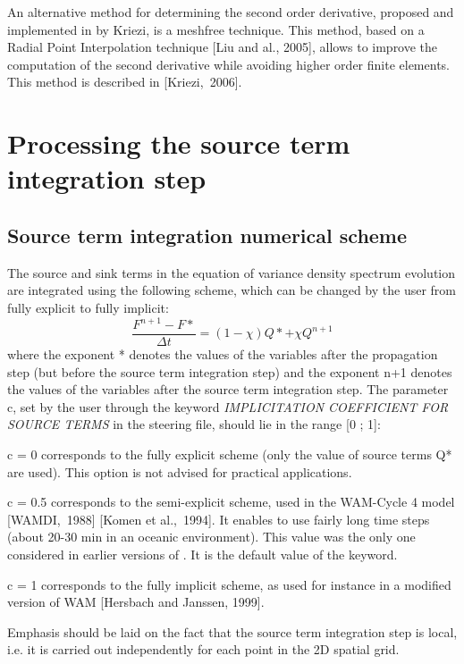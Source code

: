  An alternative method for determining the second order derivative, proposed and implemented in \tomawac by Kriezi, is a meshfree technique. This method, based on a Radial Point Interpolation technique [Liu and al., 2005], allows to improve the computation of the second derivative while avoiding higher order finite elements. This method is described in [Kriezi,~2006].




\section{ Processing the source term integration step}


\subsection{ Source term integration numerical scheme }

 The source and sink terms in the equation of variance density spectrum evolution are integrated using the following scheme, which can be changed by the user from fully explicit to fully implicit:
\begin{equation} \label{GrindEQ__6_10_}
\frac{F^{n+1} -F*}{\Delta t} =\left(1-\chi \right)Q*+\chi Q^{n+1}
\end{equation}
where the exponent * denotes the values of the variables after the propagation step (but before the source term integration step) and the exponent n+1 denotes the values of the variables after the source term integration step. The parameter c, set by the user through the keyword \textit{IMPLICITATION COEFFICIENT FOR SOURCE TERMS} in the steering file, should lie in the range [0 ; 1]:

 c = 0 corresponds to the fully explicit scheme (only the value of source terms Q* are used). This option is not advised for practical applications.

 c = 0.5 corresponds to the semi-explicit scheme, used in the WAM-Cycle 4 model [WAMDI,~1988] [Komen et al.,~1994]. It enables to use fairly long time steps (about 20-30 min in an oceanic environment). This value was the only one considered in earlier versions of \tomawac. It is the default value of the keyword.

 c = 1 corresponds to the fully implicit scheme, as used for instance in a modified version of WAM [Hersbach and Janssen, 1999].

 Emphasis should be laid on the fact that the source term integration step is local, i.e. it is carried out independently for each point in the 2D spatial grid.


